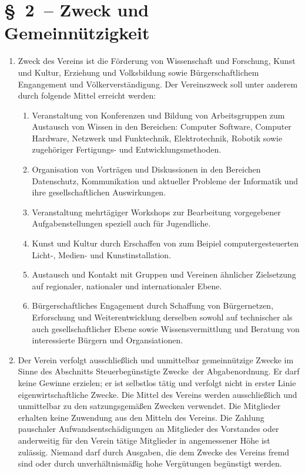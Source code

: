 \documentclass[11pt,DIV12]{scrartcl}
\begin{document}
\section*{§~2~-- Zweck und Gemeinnützigkeit}
\begin{enumerate}
\item Zweck des Vereins ist die Förderung von Wissenschaft und Forschung, Kunst und Kultur,  Erziehung und Volksbildung sowie Bürgerschaftlichem Engangement und Völkerverständigung. Der Vereinszweck soll unter anderem durch folgende Mittel erreicht werden:
\begin{enumerate}
    \item Veranstaltung von Konferenzen und Bildung von Arbeitsgruppen zum Austausch von Wissen in den Bereichen: Computer Software, Computer Hardware, Netzwerk und Funktechnik, Elektrotechnik, Robotik sowie zugehöriger Fertigungs- und Entwicklungsmethoden.
    \item Organisation von Vorträgen und Diskussionen  in den  Bereichen Datenschutz, Kommunikation und aktueller Probleme der Informatik und ihre gesellschaftlichen Auswirkungen.
    \item Veranstaltung mehrtägiger Workshops zur Bearbeitung vorgegebener Aufgabenstellungen speziell auch für Jugendliche.
    \item Kunst und Kultur durch Erschaffen von zum Beipiel computergesteuerten Licht-, Medien- und Kunstinstallation.
    \item Austausch und Kontakt mit Gruppen und Vereinen ähnlicher Zielsetzung auf regionaler, nationaler und internationaler Ebene.
    \item Bürgerschaftliches Engagement durch Schaffung von Bürgernetzen, Erforschung und Weiterentwicklung derselben sowohl auf technischer als auch gesellschaftlicher Ebene sowie Wissensvermittlung und Beratung von interessierte Bürgern und Organsiationen.
\end{enumerate}
\item Der Verein verfolgt ausschließlich und unmittelbar gemeinnützige Zwecke im Sinne des Abschnitts \glqq Steuerbegünstigte Zwecke\grqq\ der Abgabenordnung. Er darf keine Gewinne erzielen; er ist selbstlos tätig und verfolgt nicht in erster Linie eigenwirtschaftliche Zwecke. Die Mittel des Vereins werden ausschließlich und unmittelbar zu den satzungsgemäßen Zwecken verwendet. Die Mitglieder erhalten keine Zuwendung aus den Mitteln des Vereins. Die Zahlung pauschaler Aufwandsentschädigungen an Mitglieder des Vorstandes oder anderweitig für den Verein tätige Mitglieder in angemessener Höhe ist zulässig. Niemand darf durch Ausgaben, die dem Zwecke des Vereins fremd sind oder durch unverhältnismäßig hohe Vergütungen begünstigt werden.
\end{enumerate}
\end{document}
